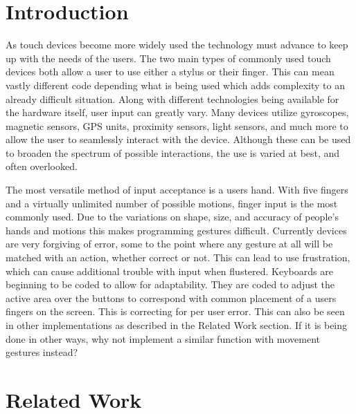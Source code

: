 \documentclass[11pt]{article}
\begin{document}
\maketitle

\vspace*{-.4in}
\section{Introduction}
\label{sec:introduction}
\vspace*{-.1in}

As touch devices become more widely used the technology must advance to keep up with the needs of the users. The two main types of commonly used touch devices both allow a user to use either a stylus or their finger. This can mean vastly different code depending what is being used which adds complexity to an already difficult situation. Along with different technologies being available for the hardware itself, user input can greatly vary. Many devices utilize gyroscopes, magnetic sensors, GPS units, proximity sensors, light sensors, and much more to allow the user to seamlessly interact with the device. Although these can be used to broaden the spectrum of possible interactions, the use is varied at best, and often overlooked. 

The most versatile method of input acceptance is a users hand. With five fingers and a virtually unlimited number of possible motions, finger input is the most commonly used. Due to the variations on shape, size, and accuracy of people's hands and motions this makes programming gestures difficult. Currently devices are very forgiving of error, some to the point where any gesture at all will be matched with an action, whether correct or not. This can lead to use frustration, which can cause additional trouble with input when flustered. Keyboards are beginning to be coded to allow for adaptability. They are coded to adjust the active area over the buttons to correspond with common placement of a users fingers on the screen. This is correcting for per user error. This can also be seen in other implementations as described in the Related Work section. If it is being done in other ways, why not implement a similar function with movement gestures instead?

\vspace*{-.1in}
\section{Related Work}
\label{sec:relatedwork}
\vspace*{-.1in}
\end{document}
